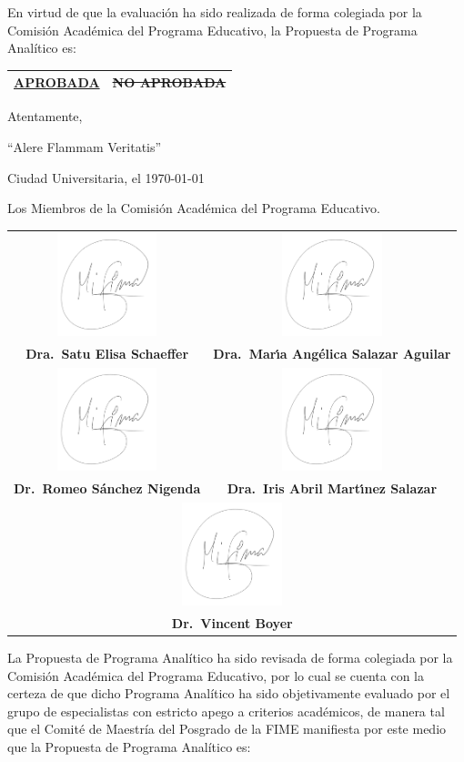 \documentclass{article}
\newcommand{\firma}{\vspace*{-10mm}\includegraphics[height=30mm]{firma.png}}
\newcommand{\angy}{Dra.\ Mar\'{\i}a Ang\'{e}lica Salazar Aguilar}
\newcommand{\vincent}{Dr.\ Vincent Boyer}
\newcommand{\iris}{Dra.\ Iris Abril Mart\'{\i}nez Salazar}
\newcommand{\elisa}{Dra.\ Satu Elisa Schaeffer}
\newcommand{\romeo}{Dr.\ Romeo S\'{a}nchez Nigenda}
\begin{document}
\newpage

En virtud de que la evaluaci\'{o}n ha sido realizada de forma colegiada por la Comisi\'{o}n Acad\'{e}mica del
Programa Educativo, la Propuesta de Programa Anal\'{i}tico es:

\begin{center}
\begin{tabular}{|c|c|}
    \hline 
    \underline{\bf APROBADA} & \st{NO APROBADA} \\
    \hline
\end{tabular}

\quad

Atentamente,

``Alere Flammam Veritatis''

Ciudad Universitaria, el \today

\quad

Los Miembros de la Comisi\'{o}n Acad\'{e}mica del Programa Educativo.

\begin{tabular}{cc}
  \firma & \firma \\
         {\bf \elisa}
         & {\bf \angy } \\
         \firma & \firma \\
                {\bf \romeo} 
                & {\bf \iris } \\
                \multicolumn{2}{c}{\firma} \\
                \multicolumn{2}{c}{\bf \vincent} 
\end{tabular}
\end{center}

\newpage

La Propuesta de Programa Anal\'{i}tico ha sido revisada de forma colegiada por la Comisi\'{o}n Acad\'{e}mica del
Programa Educativo, por lo cual se cuenta con la certeza de que dicho Programa Anal\'{i}tico ha sido
objetivamente evaluado por el grupo de especialistas con estricto apego a criterios acad\'{e}micos, de manera
tal que el Comit\'{e} de Maestr\'{i}a del Posgrado de la FIME manifiesta por este medio que la Propuesta de
Programa Anal\'{i}tico es:

\label{lastpage}
\end{document}
